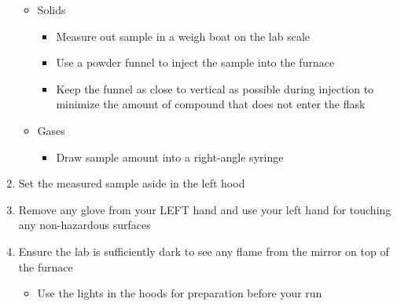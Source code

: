 \documentclass[letterpaper,11pt]{article}
\begin{document}
\begin{enumerate}
\begin{itemize}
        \item Solids
            \begin{itemize}
            \item Measure out sample in a weigh boat on the lab scale
            \item Use a powder funnel to inject the sample into the furnace
            \item Keep the funnel as close to vertical as possible during 
                injection to minimize the amount of compound that does not enter
                the flask
            \end{itemize}
            
        \item Gases
            \begin{itemize}
            \item Draw sample amount into a right-angle syringe           
            \end{itemize}
            
        \end{itemize}
    
    \item Set the measured sample aside in the left hood
    \item Remove any glove from your LEFT hand and use your left hand for 
        touching any non-hazardous surfaces
    \item Ensure the lab is sufficiently dark to see any flame from the mirror
        on top of the furnace
        \begin{itemize}
        \item Use the lights in the hoods for preparation before your run
        \end{itemize}
    

\end{enumerate}
\end{document}
